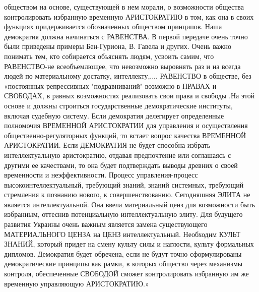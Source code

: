 обществом на основе, существующей в нем морали, о возможности общества
контролировать избранную временную АРИСТОКРАТИЮ в том, как она в своих
функциях придерживается обозначенных обществом принципов. Наша демократия
должна начинаться с РАВЕНСТВА. В первой передаче очень точно были приведены
примеры Бен-Гуриона, В. Гавела и других. Очень важно понимать тем, кто собирается
объяснять людям, усвоить самим, что РАВЕНСТВО-не всеобъемлющее, что невозможно
выровнять раз и на всегда людей по материальному
достатку, интеллекту,.... РАВЕНСТВО в обществе, без «постоянных репрессивных
"подравниваний" возможно в ПРАВАХ и СВОБОДАХ, в равных возможностях
реализовать свои права и свободы .На этой основе и должны строиться
государственные демократические институты, включая судебную систему. Если
демократия делегирует определенные полномочия ВРЕМЕННОЙ АРИСТОКРАТИИ для
управления и осуществления общественно-регуляторных функций, то встает вопрос
качества ВРЕМЕННОЙ АРИСТОКРАТИИ. Если ДЕМОКРАТИЯ не будет способна избрать
интеллектуальную аристократию, отдавая предпочтение или соглашаясь с другими
ее качествами, то она будет подтверждать выводы древних о своей временности и
неэффективности. Процесс управления-процесс высокоинтеллектуальный, требующий
знаний, знаний системных, требующий стремления к познанию нового, к
совершенствованию. Сегодняшняя ЭЛИТА не является интеллектуальной. Она ввела
материальный ценз для возможности быть избранным, оттеснив потенциальную
интеллектуальную элиту. Для будущего развития Украины очень важным является
замена существующего МАТЕРИАЛЬНОГО ЦЕНЗА на ЦЕНЗ интеллектуальный. Необходим
КУЛЬТ ЗНАНИЙ, который придет на смену культу силы и наглости, культу формальных
дипломов. Демократия будет обречена, если не будут точно сформулированы
демократические принципы как рамки, в которых общество через механизмы
контроля, обеспеченные СВОБОДОЙ сможет контролировать избранную им же
временную управляющую АРИСТОКРАТИЮ.»
